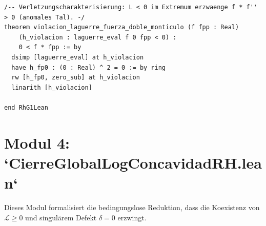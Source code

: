\documentclass[11pt,a4paper]{article}
\theoremstyle{definition}
\theoremstyle{remark}
\begin{document}
\begin{lstlisting}[language=Lean4]
/-- Verletzungscharakterisierung: L < 0 im Extremum erzwaenge f * f'' > 0 (anomales Tal). -/
theorem violacion_laguerre_fuerza_doble_monticulo (f fpp : Real)
    (h_violacion : laguerre_eval f 0 fpp < 0) :
    0 < f * fpp := by
  dsimp [laguerre_eval] at h_violacion
  have h_fp0 : (0 : Real) ^ 2 = 0 := by ring
  rw [h_fp0, zero_sub] at h_violacion
  linarith [h_violacion]

end RhG1Lean
\end{lstlisting}

\section{Modul 4: `CierreGlobalLogConcavidadRH.lean`}

Dieses Modul formalisiert die bedingungslose Reduktion, dass die Koexistenz von $\mathcal{L} \ge 0$ und singulärem Defekt $\delta = 0$ erzwingt.
\end{document}
